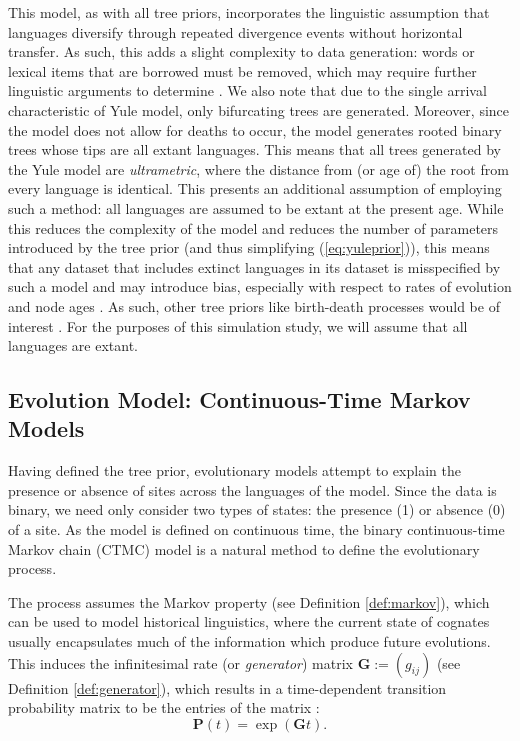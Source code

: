 This model, as with all tree priors, incorporates the linguistic assumption that languages diversify through repeated divergence events without horizontal transfer. As such, this adds a slight complexity to data generation: words or lexical items that are borrowed must be removed, which may require further linguistic arguments to determine \cite{Campbell2004}. We also note that due to the single arrival characteristic of Yule model, only bifurcating trees are generated. Moreover, since the model does not allow for deaths to occur, the model generates rooted binary trees whose tips are all extant languages. This means that all trees generated by the Yule model are \textit{ultrametric}, where the distance from (or age of) the root from every language is identical. This presents an additional assumption of employing such a method: all languages are assumed to be extant at the present age. While this reduces the complexity of the model and reduces the number of parameters introduced by the tree prior (and thus simplifying (\ref{eq:yuleprior})), this means that any dataset that includes extinct languages in its dataset is misspecified by such a model and may introduce bias, especially with respect to rates of evolution and node ages \cite{hoffmann_bayesian_2021}. As such, other tree priors like birth-death processes would be of interest \cite{Gernhard2008}. For the purposes of this simulation study, we will assume that all languages are extant.

\subsection{Evolution Model: Continuous-Time Markov Models}
\label{sec:ctmc}
Having defined the tree prior, evolutionary models attempt to explain the presence or absence of sites across the languages of the model. Since the data is binary, we need only consider two types of states: the presence (1) or absence (0) of a site. As the model is defined on continuous time, the binary continuous-time Markov chain (CTMC) model is a natural method to define the evolutionary process.

The process assumes the Markov property (see Definition \ref{def:markov}), which can be used to model historical linguistics, where the current state of cognates usually encapsulates much of the information which produce future evolutions. This induces the infinitesimal rate (or \textit{generator}) matrix $\mathbf{G} := (g_{ij})$ (see Definition \ref{def:generator}), which results in a time-dependent transition probability matrix to be the entries of the matrix \cite{Anderson1991}:
\begin{equation}
\label{eq:transitionmatrixevolution}
    \mathbf{P}(t) = \exp(\mathbf{G}t).
\end{equation}

